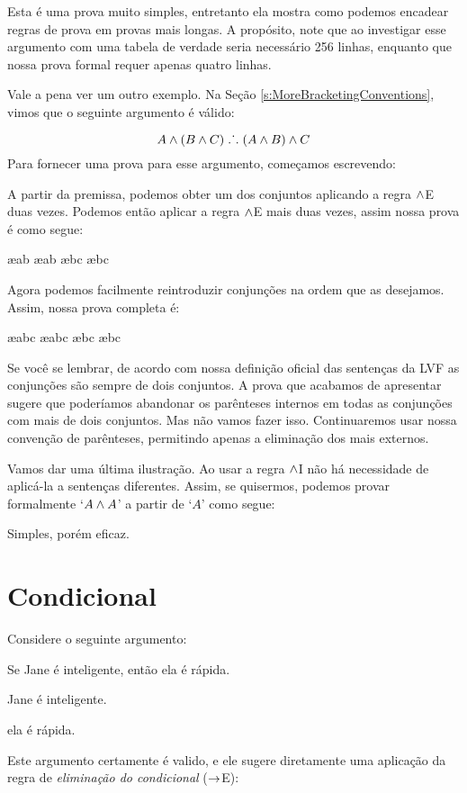  Esta é uma prova muito simples, entretanto ela mostra como podemos encadear regras de  prova em provas mais longas.  A propósito, note que ao investigar esse argumento com uma tabela de verdade seria necessário 256 linhas, enquanto que nossa prova formal requer apenas quatro linhas.

Vale a pena ver um outro exemplo.  Na Seção   \ref{s:MoreBracketingConventions}, vimos  que o seguinte  argumento é válido:

	$$A \wedge (B \wedge C) \mathrel{\ldotp\dot{}\,\ldotp} (A \wedge B) \wedge C$$
 Para fornecer uma prova para esse argumento,  começamos escrevendo: 
\begin{fitchproof}
\end{fitchproof}
 A partir da premissa, podemos obter um dos conjuntos aplicando a regra $\wedge$E duas vezes. Podemos então aplicar a regra $\wedge$E mais duas vezes,  assim nossa prova é como segue: 
\begin{fitchproof}
	 \ae{ab}
	 \ae{ab}
	 \ae{bc}
	 \ae{bc}
\end{fitchproof}
 Agora podemos facilmente reintroduzir conjunções na ordem que as desejamos. Assim, nossa prova  completa é:
 
\begin{fitchproof}
	 \ae{abc}
	 \ae{abc}
	 \ae{bc}
	 \ae{bc}
\end{fitchproof}
Se você se lembrar, de acordo com nossa definição oficial das sentenças da LVF as conjunções são sempre de dois conjuntos. A prova que acabamos de apresentar sugere que poderíamos abandonar os parênteses internos em todas as conjunções com mais de dois conjuntos. Mas não vamos fazer isso. Continuaremos usar nossa convenção de parênteses, permitindo apenas a eliminação dos mais externos.

Vamos dar uma última ilustração. Ao usar a regra $\wedge$I 
não há necessidade de aplicá-la a sentenças diferentes.
Assim, se quisermos, podemos provar formalmente  `$A \wedge A$' a partir de `$A$' como  segue:
\begin{fitchproof}
\end{fitchproof}
Simples, porém eficaz.

\section{Condicional}
Considere o seguinte argumento:
\begin{earg}
		\item[] Se Jane é inteligente, então ela é rápida.
		\item[] Jane é inteligente.
		\item[\therefore] ela é rápida.
\end{earg}
Este argumento certamente é valido, e ele sugere diretamente uma aplicação da  regra de \textit{eliminação do condicional}  ($\rightarrow$E):
 
